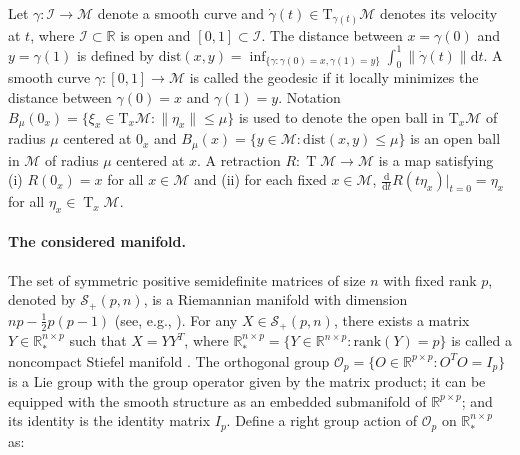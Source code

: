 \documentclass[11pt]{article}
\newcommand{\zwhcomm}[2]{{\sf\color{purple} #1}{\sf\color{blue} #2}}
\numberwithin{equation}{section}
\DeclareMathOperator{\T}{\mathrm{T}}
\def\M{\mathcal{M}}
\begin{document}
Let $\gamma:\mathcal{I} \rightarrow \mathcal{M}$ denote a smooth curve and $\dot{\gamma}(t)\in\mathrm{T}_{\gamma(t)}\mathcal{M}$ denotes its velocity at $t$, where $\mathcal{I} \subset \mathbb{R}$ is open and $[0, 1] \subset \mathcal{I}$. The distance between $x=\gamma(0)$ and $y=\gamma(1)$ is defined by $\mathrm{dist}(x,y)= \inf_{\{\gamma:\gamma(0)=x,\gamma(1)=y\}}\int_0^1\|\dot{\gamma}(t)\|\mathrm{d}t$. A smooth curve $\gamma:[0,1]\rightarrow \mathcal{M}$ is called the geodesic if it locally minimizes the distance between $\gamma(0)=x$ and $\gamma(1)=y$. %
Notation $B_{\mu}(0_x)=\{\xi_x\in \mathrm{T}_x\mathcal{M}: \|\eta_x\| \le \mu\}$ is used to denote the open ball in $\mathrm{T}_x \mathcal{M}$ of radius $\mu$ centered at $0_x$ and $B_{\mu}(x)=\{y\in\mathcal{M}:\mathrm{dist}(x,y)\le \mu\}$ is an open ball in $\mathcal{M}$ of radius $\mu$ centered at $x$. A retraction $R:\T\M \rightarrow \M$ is a map satisfying (i) $R(0_x)=x$ for all $x\in \M$ and (ii) for each fixed $x\in \M$, $\frac{\mathrm{d}}{\mathrm{d} t}R(t\eta_x)\big|_{t=0}=\eta_x$ for all $\eta_x\in\T_x\M$. 

\paragraph{The considered manifold.} The set of symmetric positive semidefinite matrices of size $n$ with fixed rank $p$, denoted by $\mathcal{S}_+(p,n)$, is a Riemannian manifold with dimension $np-\frac{1}{2}p(p-1)$ (see, e.g., \cite{Helmke1995CriticalPO}). For any $X\in\mathcal{S}_+(p,n)$, there exists a matrix $Y\in \mathbb{R}^{n\times p}_*$ such that $X=YY^T$, where $\mathbb{R}^{n\times p}_* = \{Y \in \mathbb{R}^{n \times p} : \mathrm{rank}(Y) = p\}$ is called a noncompact Stiefel manifold \cite[Chapter 3]{AbsMahSep2008}. The orthogonal group $\mathcal{O}_p = \{O \in \mathbb{R}^{p \times p}: O^T O = I_p\}$ is a Lie group with the group operator given by the matrix product; it can be equipped with the smooth structure as an embedded submanifold of $\mathbb{R}^{p \times p}$; and its identity is the identity matrix $I_p$. Define a right group action of $\mathcal{O}_p$ on $\mathbb{R}^{n\times p}_*$ as: 
\end{document}
